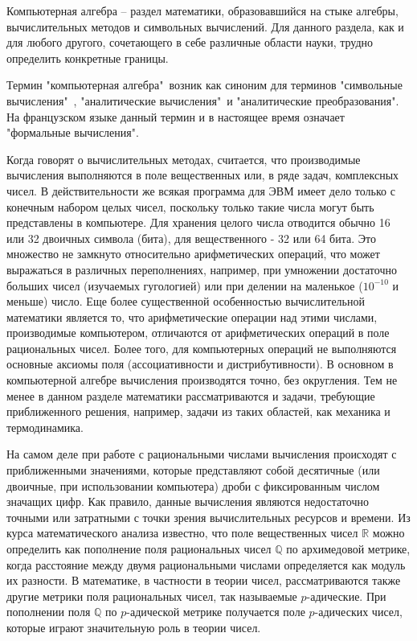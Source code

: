 \documentclass[master, och, diploma, times]{sty/SCWorks}
\theoremstyle{plain}
\theoremstyle{definition}
\numberwithin{equation}{section}
\begin{document}
\intro

Компьютерная алгебра -- раздел математики, образовавшийся на стыке алгебры, вычислительных методов и символьных вычислений. Для данного раздела, как и для любого другого, сочетающего в себе различные области науки, трудно определить конкретные границы.

Термин "компьютерная алгебра"\ возник как синоним для терминов "символьные вычисления"\ , "аналитические вычисления"\ и "аналитические преобразования". На французском языке данный термин и в настоящее время означает "формальные вычисления".

Когда говорят о вычислительных методах, считается, что производимые вычисления выполняются в поле вещественных или, в ряде задач, комплексных чисел. В действительности же всякая программа для ЭВМ имеет дело только с конечным набором целых чисел, поскольку только такие числа могут быть представлены в компьютере. Для хранения целого числа отводится обычно 16 или 32 двоичных символа (бита), для вещественного - 32 или 64 бита. Это множество не замкнуто относительно арифметических операций, что может выражаться в различных переполнениях, например, при умножении достаточно больших чисел (изучаемых гугологией) или при делении на маленькое ($10^{-10}$ и меньше) число. Еще более  существенной особенностью вычислительной математики является то, что арифметические операции над этими числами, производимые компьютером, отличаются от арифметических операций в поле рациональных чисел. Более того, для компьютерных операций не выполняются основные аксиомы поля (ассоциативности и дистрибутивности). В основном в компьютерной алгебре вычисления производятся точно, без округления. Тем не менее в данном разделе математики рассматриваются и задачи, требующие приближенного решения, например, задачи из таких областей, как механика и термодинамика. 
 
На самом деле при работе с рациональными числами вычисления происходят с приближенными значениями, которые представляют собой десятичные (или двоичные, при использовании компьютера) дроби с фиксированным числом значащих цифр.  Как правило, данные вычисления являются недостаточно точными или затратными с точки зрения вычислительных ресурсов и времени.
Из курса математического анализа известно, что поле вещественных чисел $\mathbb{R}$ можно определить как пополнение поля рациональных чисел $\mathbb{Q}$ по архимедовой метрике, когда расстояние между двумя рациональными числами определяется как модуль их разности. В математике, в частности в теории чисел, рассматриваются также другие метрики поля рациональных чисел, так называемые $p$-адические. При пополнении поля $\mathbb{Q}$ по $p$-адической метрике получается поле $p$-адических чисел, которые играют значительную роль в теории чисел.
 
\end{document}
